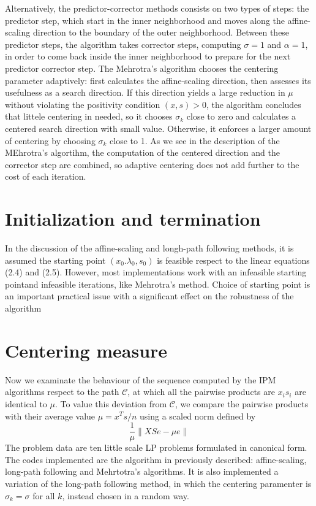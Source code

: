 \documentclass[a4paper,10 pt,titlepage,twoside]{book}
\theoremstyle{plain}
\theoremstyle{definition}
\theoremstyle{remark}
\begin{document}
Alternatively, the predictor-corrector methods consists on two types of steps: the predictor step, which start in the inner neighborhood and moves along the affine-scaling direction to the boundary of the outer neighborhood. Between these predictor steps, the algorithm takes corrector steps, computing $\sigma = 1$ and $\alpha= 1$, in order to come back inside the inner neighborhood to prepare for the next predictor corrector step. The Mehrotra's algorithm chooses the centering parameter adaptively: first calculates the affine-scaling direction, then assesses its usefulness as a search direction. If this direction yields a large reduction in $\mu$ without violating the positivity condition $(x, s)> 0$, the algorithm concludes that littele centering in needed, so it chooses $\sigma_{k}$ close to zero and calculates a centered search direction with small value. Otherwise, it enforces a larger amount of centering by choosing $\sigma_{k}$ close to 1. As we see in the description of the MEhrotra's algortihm, the computation of the centered direction and the corrector step are combined, so adaptive centering does not add further to the cost of each iteration. 
\section*{Initialization and termination}
In the discussion of the affine-scaling and longh-path following methods, it is assumed the starting point $(x_{0}. \lambda_{0}, s_{0})$ is feasible respect to the linear equations (2.4) and (2.5). However, most implementations work with an infeasible starting pointand infeasible iterations, like Mehrotra's method. 
Choice of starting point is an important practical issue with a significant effect on the robustness of the algorithm
\section*{Centering measure}
Now we examinate the behaviour of the sequence computed by the IPM algorithms respect to the path $\mathcal{C}$, at which all the pairwise products are $x_{i}s_{i}$ are identical to $\mu$. To value this deviation from $\mathcal{C}$, we compare the pairwise products with their average value $\mu = x^{T}s/n$ using a scaled norm defined by
\begin{equation}
\frac{1}{\mu}\lVert XSe - \mu e \rVert
\end{equation}
The problem data are ten little scale LP problems formulated in canonical form. The codes implemented are the algorithm in previously described: affine-scaling, long-path following and Mehrtotra's algorithms. It is also implemented a variation of the long-path following method, in which the centering paramenter is $\sigma_{k}=\sigma$ for all $k$, instead chosen in a random way.
\end{document}
